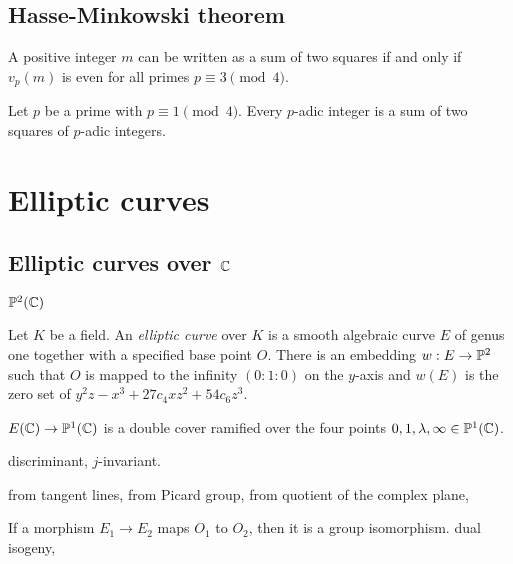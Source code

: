 \documentclass{../../large}
\begin{document}
\section{Hasse-Minkowski theorem}

\begin{thm}
A positive integer $m$ can be written as a sum of two squares if and only if $v_p(m)$ is even for all primes $p\equiv3\pmod4$.

Let $p$ be a prime with $p\equiv1\pmod4$.
Every $p$-adic integer is a sum of two squares of $p$-adic integers.
\end{thm}





\chapter{Elliptic curves}
\section{Elliptic curves over $\C$}

$\P^2(\C)$
\begin{prb}
Let $K$ be a field.
An \emph{elliptic curve} over $K$ is a smooth algebraic curve $E$ of genus one together with a specified base point $O$.
There is an embedding $w:E\to\P^2$ such that $O$ is mapped to the infinity $(0:1:0)$ on the $y$-axis and $w(E)$ is the zero set of $y^2z-x^3+27c_4xz^2+54c_6z^3$.
\end{prb}

\begin{prb}
$E(\C)\to\P^1(\C)$ is a double cover ramified over the four points $0,1,\lambda,\infty\in\P^1(\C)$.
\end{prb}

\begin{prb}
discriminant, $j$-invariant.
\end{prb}


\begin{prb}
from tangent lines, from Picard group, from quotient of the complex plane,
\end{prb}

\begin{prb}[Isogenies]
If a morphism $E_1\to E_2$ maps $O_1$ to $O_2$, then it is a group isomorphism.
dual isogeny,
\end{prb}
\end{document}

